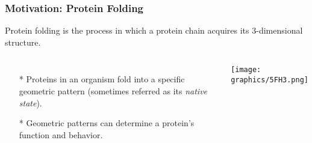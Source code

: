 \documentclass{beamer}
\begin{document}
\begin{frame}
  \frametitle{Motivation: Protein Folding}
  Protein folding is the process in which a protein chain acquires its 3-dimensional structure.
  \begin{columns}[c] %
   \begin{itemize}
    \item[*] Proteins in an organism fold into a specific geometric pattern (sometimes referred as its \textit{native state}).
    \item[*]  Geometric patterns can determine a protein's function and behavior.
   \end{itemize}
     \begin{minipage}{\linewidth}
    \begin{center}
    \texttt{[image: graphics/5FH3.png]}
    \end{center}
  \end{minipage}
  \end{columns}
\end{frame}
\end{document}
